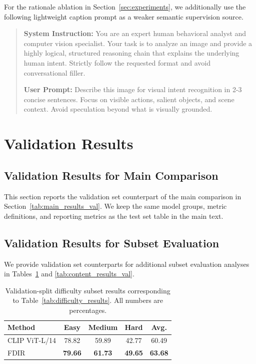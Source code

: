 For the rationale ablation in Section~\ref{sec:experiments}, we additionally use the following lightweight caption prompt as a weaker semantic supervision source.

\begin{quote}
    \textbf{System Instruction:} You are an expert human behavioral analyst and computer vision specialist. Your task is to analyze an image and provide a highly logical, structured reasoning chain that explains the underlying human intent. Strictly follow the requested format and avoid conversational filler.

    \textbf{User Prompt:} Describe this image for visual intent recognition in 2-3 concise sentences. Focus on visible actions, salient objects, and scene context. Avoid speculation beyond what is visually grounded.
\end{quote}

\section{Validation Results}
\subsection{Validation Results for Main Comparison}
\label{app:validation_results_main}

This section reports the validation set counterpart of the main comparison in Section~\ref{tab:main_results_val}. We keep the same model groups, metric definitions, and reporting metrics as the test set table in the main text.


\subsection{Validation Results for Subset Evaluation}
\label{app:validation_results_subsets}

We provide validation set counterparts for additional subset evaluation analyses in Tables~\ref{tab:difficulty_results_val} and \ref{tab:content_results_val}.

\begin{table}[H]
\centering
\caption{Validation-split difficulty subset results corresponding to Table~\ref{tab:difficulty_results}. All numbers are percentages.}
\label{tab:difficulty_results_val}
\begin{tabular}{lcccc}
\hline
Method & Easy & Medium & Hard & Avg. \\
\hline
CLIP ViT-L/14 \cite{radford_learning_2021} & 78.82 & 59.89 & 42.77 & 60.49 \\
FDIR & \textbf{79.66} & \textbf{61.73} & \textbf{49.65} & \textbf{63.68} \\
\hline
\end{tabular}
\end{table}


